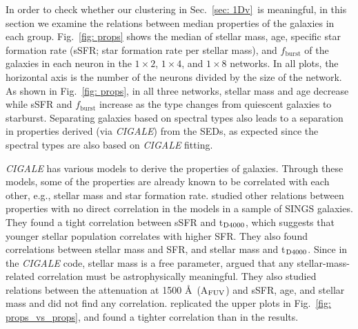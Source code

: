        In order to check whether our clustering in Sec.~\ref{sec: 1Dv}~is meaningful, in this section we examine the relations between median properties of the galaxies in each group. 
          Fig.~\ref{fig: props} shows the median of stellar mass, age, specific star formation rate (sSFR; star formation rate per stellar mass), and $f_\mathrm{burst}$ of the galaxies in each neuron in the $1\times2$, $1\times4$, and $1\times8$ networks.
        In all plots, the horizontal axis is the number of the neurons divided by the size of the network.
        As shown in Fig.~\ref{fig: props}, in all three networks, stellar mass and age decrease while sSFR and $f_\mathrm{burst}$ increase as the type changes from quiescent galaxies to starburst.
       Separating galaxies based on spectral types also leads to a separation in properties derived (via {\em CIGALE}) from the SEDs, as expected since the spectral types are also based on {\em CIGALE} fitting. 
    

        {\em CIGALE} has various models to derive the properties of galaxies.
        Through these models, some of the properties are already known to be correlated with each other, e.g., stellar mass and star formation rate.
         studied other relations between properties with no direct correlation in the models in a sample of SINGS galaxies.
        They found a tight correlation between sSFR and t$_{\rm {D4000}}$, which suggests that younger stellar population correlates with higher SFR.
        They also found correlations between stellar mass and SFR, and stellar mass and t$_{\rm {D4000}}$.
        Since in the {\em CIGALE} code, stellar mass is a free parameter,  argued that any stellar-mass-related correlation must be astrophysically meaningful. 
        They also studied relations between the attenuation at 1500 \AA~(A$_{\rm {FUV}}$) and sSFR, age, and stellar mass and did not find any correlation.
         replicated the upper plots in Fig.~\ref{fig: props_vs_props}, and found a tighter correlation than in the  results. 
        
